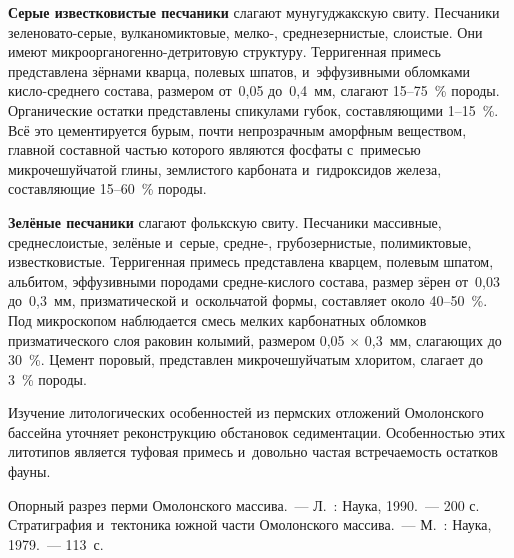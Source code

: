 \textbf{Серые известковистые песчаники} слагают мунугуджакскую свиту. Песчаники зе\-ле\-но\-ва\-то-серые, вулканомиктовые, мелко-, среднезернистые, слоистые. Они имеют микро\-ор\-га\-но\-ген\-но-детритовую структуру. Терригенная примесь представлена зёрнами кварца, полевых шпатов, и~эффузивными обломками кисло-среднего состава, размером от~0,05 до~0,4~мм, слагают 15--75~\% породы. Органические остатки представлены спикулами губок, составляющими 1--15~\%. Всё это цементируется бурым, почти непрозрачным аморфным веществом, главной составной частью которого являются фосфаты с~примесью микрочешуйчатой глины, землистого карбоната и~гидроксидов железа, составляющие 15--60~\% породы.

\textbf{Зелёные песчаники} слагают фолькскую свиту. Песчаники массивные, среднеслоистые, зелёные и~серые, средне-, грубозернистые, полимиктовые, известковистые. Терригенная примесь представлена кварцем, полевым шпатом, альбитом, эффузивными породами средне-кислого состава, размер зёрен от~0,03 до~0,3~мм, призматической и~оскольчатой формы, составляет около 40--50~\%. Под микроскопом наблюдается смесь мелких карбонатных обломков призматического слоя раковин колымий, размером 0,05 $\times$ 0,3~мм, слагающих до 30~\%. Цемент поровый, представлен микрочешуйчатым хлоритом, слагает до 3~\% породы.

Изучение литологических особенностей из пермских отложений Омолонского бассейна уточняет реконструкцию обстановок седиментации. Особенностью этих литотипов является туфовая примесь и~довольно частая встречаемость остатков фауны.
\vspace{-8pt}
\begin{thebibliography}{99}
\vspace{-6pt}
\bibitem{} Опорный разрез перми Омолонского массива.~--- Л.~: Наука, 1990.~--- 200 с.\enlargethispage{2\baselineskip}
\bibitem{} Стратиграфия и~тектоника южной части Омолонского массива.~--- М.~: Наука, 1979.~--- 113~с.
\end{thebibliography}

